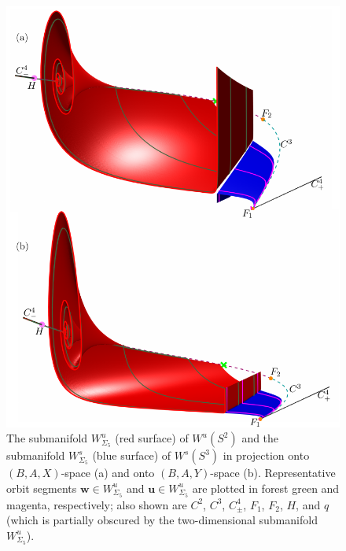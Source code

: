 \documentclass{ws-ijbc}
\begin{document}
\begin{figure}[t!]
\centering
\includegraphics[]{./figures/MKMO_9.pdf}
\caption{The submanifold $W^u_{\Sigma_5}$ (red surface) of $W^u(S^2)$ and the submanifold $W^s_{\Sigma_5}$ (blue surface) of $W^s(S^3)$ in projection onto $(B,A,X)$-space (a) and onto $(B,A,Y)$-space (b). Representative orbit segments $\mathbf{w} \in W^u_{\Sigma_5}$ and $\mathbf{u} \in W^u_{\Sigma_5}$ are plotted in forest green and magenta, respectively; also shown are $C^2$, $C^3$, $C^4_\pm$, $F_1$, $F_2$, $H$, and $q$ (which is partially obscured by the two-dimensional submanifold $W^u_{\Sigma_5}$). }
\label{figure_9}
\end{figure}
\end{document}
